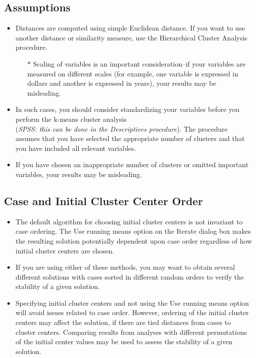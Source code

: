 \documentclass[a4paper,12pt]{article}
\begin{document}
\subsection*{Assumptions}
\begin{itemize}
	\item  Distances are computed using simple Euclidean distance. If you want to use another distance or similarity measure, use the Hierarchical Cluster Analysis procedure. 
	\begin{itemize}
		\item[$\ast$] Scaling of variables is an important consideration--if your variables are measured on different scales (for example, one variable is expressed in dollars and another is expressed in years), your results may be misleading.
	\end{itemize}
	\item  In such cases, you should consider standardizing your variables before you perform the k-means cluster analysis \\ (\textit{SPSS: this can be done in the Descriptives procedure}). The procedure assumes that you have selected the appropriate number of clusters and that you have included all relevant variables. 
	\item If you have chosen an inappropriate number of clusters or omitted important variables, your results may be misleading.
\end{itemize}


\subsection*{Case and Initial Cluster Center Order} 
\begin{itemize}
	\item The default algorithm for choosing initial cluster centers is not invariant to case ordering. The Use running means option on the Iterate dialog box makes the resulting solution potentially dependent upon case order regardless of how initial cluster centers are chosen. 
	\item If you are using either of these methods, you may want to obtain several different solutions with cases sorted in different random orders to verify the stability of a given solution. \item Specifying initial cluster centers and not using the Use running means option will avoid issues related to case order. However, ordering of the initial cluster centers may affect the solution, if there are tied distances from cases to cluster centers. Comparing results from analyses with different permutations of the initial center values may be used to assess the stability of a given solution.
	\end{itemize}
\end{document}
